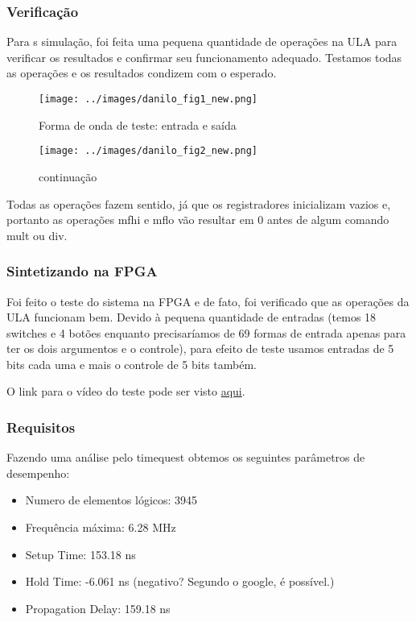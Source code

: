 \subsubsection{Verificação}
Para s simulação, foi feita uma pequena quantidade de operações na ULA para verificar os resultados e confirmar seu funcionamento adequado. Testamos todas as operações e os resultados condizem com o esperado.
\begin{figure}[H]
	\centering
	\texttt{[image: ../images/danilo\_fig1\_new.png]}
	\caption{Forma de onda de teste: entrada e saída}
\end{figure}

\begin{figure}[H]
	\centering
	\texttt{[image: ../images/danilo\_fig2\_new.png]}
	\caption{continuação}
\end{figure}

Todas as operações fazem sentido, já que os registradores inicializam vazios e, portanto as operações mfhi e mflo vão resultar em 0 antes de algum comando mult ou div.

\subsubsection{Sintetizando na FPGA}
Foi feito o teste do sistema na FPGA e de fato, foi verificado que as operações da ULA funcionam bem. Devido à pequena quantidade de entradas (temos 18 switches e 4 botões enquanto precisaríamos de 69 formas de entrada apenas  para ter os dois argumentos e o controle), para efeito de teste usamos entradas de 5 bits cada uma e mais o controle de 5 bits também.

O link para o vídeo do teste pode ser visto \href{https://www.youtube.com/watch?v=dkLe0ooJMr4&feature=youtu.be}{aqui}.

\subsubsection{Requisitos}
Fazendo uma análise pelo timequest obtemos os seguintes parâmetros de desempenho:
\begin{itemize}
\item	Numero de elementos lógicos: 3945
\item	Frequência máxima: 6.28 MHz
\item	Setup Time: 153.18 ns
\item	Hold Time: -6.061 ns (negativo? Segundo o google, é possível.)
\item	Propagation Delay: 159.18 ns
\end{itemize}


